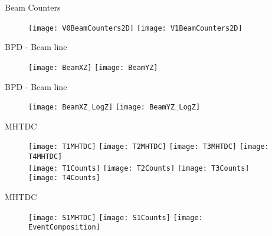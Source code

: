 \documentclass[11pt]{beamer}
\begin{document}
\begin{frame}{Beam Counters}                                                                        
\begin{figure}   
\texttt{[image: V0BeamCounters2D]} 
\texttt{[image: V1BeamCounters2D]} 
\end{figure}                                                                                        
\end{frame}  

\begin{frame}{BPD - Beam line}  
  \begin{figure}   
    \centering  
    \texttt{[image: BeamXZ]}  
    \texttt{[image: BeamYZ]}  
  \end{figure}  
\end{frame} 

\begin{frame}{BPD - Beam line}  
  \begin{figure}   
    \centering  
    \texttt{[image: BeamXZ\_LogZ]}  
    \texttt{[image: BeamYZ\_LogZ]}  
  \end{figure}  
\end{frame} 

\begin{frame}{MHTDC}
\begin{figure}
\centering
\texttt{[image: T1MHTDC]} 
\texttt{[image: T2MHTDC]} 
\texttt{[image: T3MHTDC]} 
\texttt{[image: T4MHTDC]} \\
\texttt{[image: T1Counts]} 
\texttt{[image: T2Counts]} 
\texttt{[image: T3Counts]} 
\texttt{[image: T4Counts]} 
\end{figure}
\end{frame}

\begin{frame}{MHTDC}
\begin{figure}
\centering
\texttt{[image: S1MHTDC]} 
\texttt{[image: S1Counts]} 
\texttt{[image: EventComposition]} 
\end{figure}
\end{frame}
\end{document}
